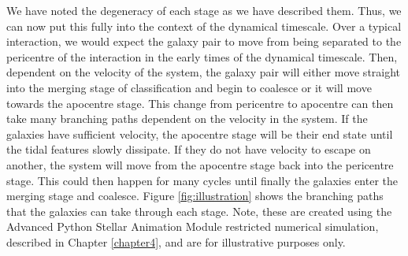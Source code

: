 We have noted the degeneracy of each stage as we have described them. Thus, we can now put this fully into the context of the dynamical timescale. Over a typical interaction, we would expect the galaxy pair to move from being separated to the pericentre of the interaction in the early times of the dynamical timescale. Then, dependent on the velocity of the system, the galaxy pair will either move straight into the merging stage of classification and begin to coalesce or it will move towards the apocentre stage. This change from pericentre to apocentre can then take many branching paths dependent on the velocity in the system. If the galaxies have sufficient velocity, the apocentre stage will be their end state until the tidal features slowly dissipate. If they do not have velocity to escape on another, the system will move from the apocentre stage back into the pericentre stage. This could then happen for many cycles until finally the galaxies enter the merging stage and coalesce. Figure \ref{fig:illustration} shows the branching paths that the galaxies can take through each stage. Note, these are created using the Advanced Python Stellar Animation Module restricted numerical simulation, described in Chapter \ref{chapter4}, and are for illustrative purposes only.


